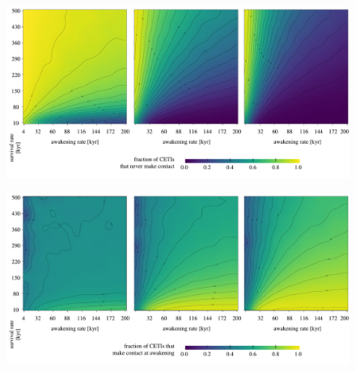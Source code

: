  


\begin{figure} %
   \centering
   \includegraphics[width=\textwidth]{matrix_1.pdf}
   \label{F_never_contact}
\end{figure}
 
\begin{figure} %
   \centering
   \includegraphics[width=\textwidth]{matrix_2.pdf}
   \label{F_C_at_A}
\end{figure}
 
